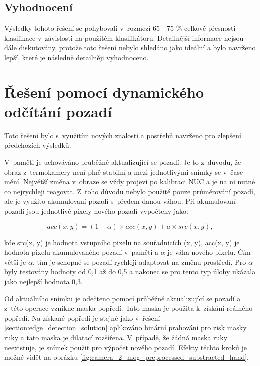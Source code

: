 	\subsection{Vyhodnocení}
    Výsledky tohoto řešení se pohybovali v~rozmezí 65 - 75 \% celkové přesnosti klasifikace v~závislosti na použitém klasifikátoru. Detailnější informace nejsou dále diskutovány, protože toto řešení nebylo shledáno jako ideální a bylo navrženo lepší, které je následně detailněji vyhodnoceno.
         
\clearpage

\section{Řešení pomocí dynamického odčítání pozadí} \label{section:background_substract_solution}
Toto řešení bylo s~využitím nových znalostí a postřehů navrženo pro zlepšení předchozích výsledků. %

V~paměti je uchováváno průběžně aktualizující se pozadí. Je to z~důvodu, že obraz z~termokamery není plně stabilní a mezi jednotlivými snímky se v~čase mění. Největší změna v~obraze se vždy projeví po  kalibraci NUC a je na ni nutné co nejrychleji reagovat. Z~toho důvodu nebylo použité pouze průměrování pozadí, ale je využito akumulovaní pozadí s~předem danou váhou. Při akumulovaní pozadí jsou jednotlivé pixely nového pozadí vypočteny jako:

\begin{equation}
	acc(x, y) = (1 - \alpha) \times acc(x, y) + a \times src(x,y),
\end{equation}

kde src(x, y) je hodnota vstupního pixelu na souřadnicích (x, y), acc(x, y) je hodnota pixelu akumulovaného pozadí v~paměti a $\alpha$ je váha nového pixelu. Čím větší je $\alpha$, tím je schopné se pozadí rychleji adaptovat na změnu prostředí. Pro $\alpha$ byly testovány hodnoty od 0,1 až do 0,5 a nakonec se pro tento typ úlohy ukázala jako nejlepší hodnota 0,3.

Od aktuálního snímku je odečteno pomocí \cite{opencvMOG} průběžně aktualizující se pozadí a z~této operace vznikne maska popředí. Tato maska je použita k~získání reálného popředí. Na získané popředí je stejně jako v~řešení \ref{section:edge_detection_solution} aplikováno binární prahování pro zisk masky ruky a tato maska je dilatací rozšířena. V~případě, že žádná maska ruky neexistuje, je snímek použit pro výpočet nového pozadí. Efekty těchto kroků je možné vidět na obrázku \ref{fig:camera_2_mog_preprocessed_substracted_hand}.

